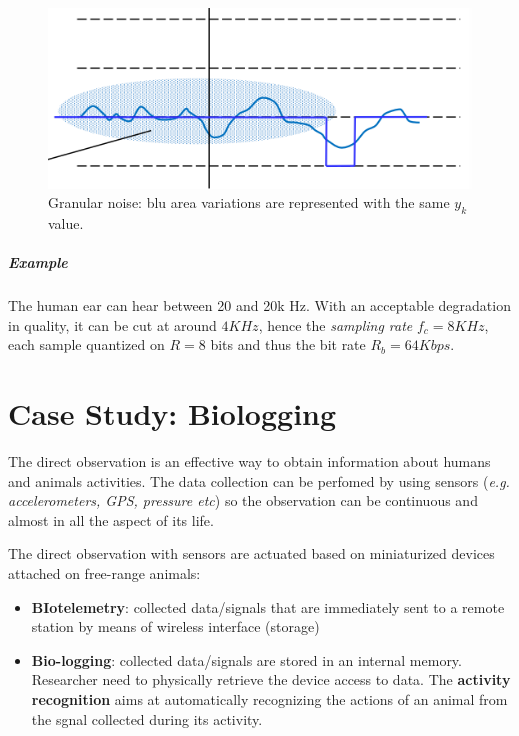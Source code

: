 \documentclass[10pt,a4paper]{report}
\theoremstyle{definition}
\begin{document}
\begin{figure}[h]
	\centering\includegraphics[scale=0.50]{images/Pasted image 20230526142412.png}
	\caption{Granular noise: blu area variations are represented with the same $y_{k}$ value.}
	\label{granular-noise-scenario}
\end{figure}


\paragraph{Example}\label{sec:example-1}
The human ear can hear between 20 and 20k Hz. With an acceptable degradation in quality, it can be cut at around $4KHz$, hence the \textit{sampling rate} $f_{c} = 8KHz$, each sample quantized on $R=8$ bits and thus the bit rate $R_{b} = 64Kbps$.





\appendix
\iffalse
\chapter{Case Study: Biologging}\label{sec:case-study-biologging}
The direct observation is an effective way to obtain information about humans and animals activities. The data collection can be perfomed by using sensors (\textit{e.g. accelerometers, GPS, pressure etc}) so the observation can be continuous and almost in all the aspect of its life.

The direct observation with sensors are actuated based on miniaturized devices attached on free-range animals:
\begin{itemize}
	\item 
	\textbf{BIotelemetry}: collected data/signals that are immediately sent to a remote station by means of wireless interface (storage)
	\item 
	\textbf{Bio-logging}: collected data/signals are stored in an internal memory. Researcher need to physically retrieve the device access to data.
	The \textbf{activity recognition} aims at automatically recognizing the actions of an animal from the sgnal collected during its activity.
\end{itemize}
\end{document}
